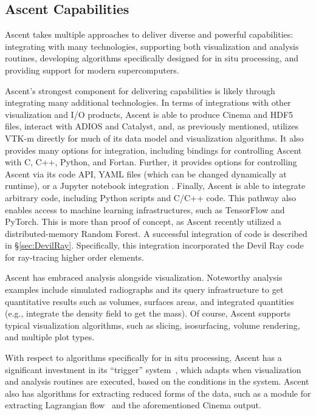 \documentclass[graybox]{svmult}
\begin{document}
\subsection{Ascent Capabilities}
\label{subsec:capabilities}

Ascent takes multiple approaches to deliver diverse and powerful capabilities:
integrating with many technologies,
supporting both visualization and analysis routines,
developing algorithms specifically designed for in situ processing,
and providing support for modern supercomputers.

Ascent's strongest component for delivering capabilities is likely
through integrating many additional technologies.
%
In terms of integrations with other visualization and I/O products,
Ascent is able to produce Cinema and HDF5 files, interact with
ADIOS and Catalyst, and, as previously mentioned, utilizes VTK-m
directly for much of its data model and visualization algorithms.
%
It also provides many options for integration, including
bindings
for controlling Ascent with  C, C++, Python, and Fortan.
%
Further, it provides options for controlling Ascent via its code API,
YAML files (which can be changed dynamically at runtime), or
a Jupyter notebook integration \cite{CyrusISAV}.
%
Finally, Ascent is able to integrate arbitrary code, including
Python scripts and C/C++ code.
%
This pathway also enables access to
machine learning infrastructures, such as TensorFlow and PyTorch.
%
This is more than proof of concept,
as Ascent recently utilized a distributed-memory Random Forest.
%
A successful integration of code is described in \S\ref{sec:DevilRay}.
%
Specifically, this integration incorporated the Devil Ray code for ray-tracing
higher order elements.

Ascent has embraced analysis alongside visualization.
%
Noteworthy analysis examples include simulated radiographs and its
query infrastructure to get quantitative results such as volumes,
surfaces areas, and integrated quantities (e.g., integrate the density field to get the mass).
%
Of course, Ascent supports typical visualization algorithms, such as
slicing, isosurfacing, volume rendering, and multiple plot types.

With respect to algorithms specifically for in situ processing, Ascent
has a significant investment in its ``trigger'' system~\cite{Larsen:ISAV18},
which adapts when visualization and analysis routines are executed,
based on the conditions in the system.
%
Ascent also has algorithms for extracting reduced forms of the data,
such as a module for extracting Lagrangian flow~\cite{Agranovsky:LDAV2014,Sane:EGPGV19} and the
aforementioned Cinema output.
\end{document}
